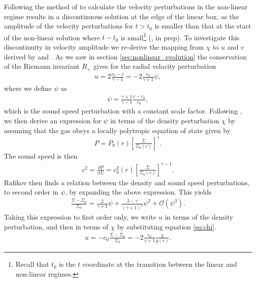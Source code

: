 Following the method of \citet{bollati2021} to calculate the velocity perturbations in the non-linear regime results in a discontinuous solution at the edge of the linear box, as the amplitude of the velocity perturbations for $t>t_0$ is smaller than that at the start of the non-linear solution where $t-t_0$ is small\footnote{Recall that $t_0$ is the $t$ coordinate at the transition between the linear and non-linear regimes.} (\citeauthor{fasanoinprep.}, in prep).
To investigate this discontinuity in velocity amplitude we re-derive the mapping from $\chi$ to $u$ and $v$ derived by \citet{rafikov2002a} and \citet{bollati2021}.
As we saw in section \ref{sec:nonlinear_evolution} the conservation of the Riemann invariant $R_+$ gives for the radial velocity perturbation
\begin{align}
    u = 2\frac{c_0-c}{\gamma - 1}=-2\frac{c_0}{\gamma + 1} \psi, \label{eq:u_rafikov}
\end{align}
where we define $\psi$ as
\begin{align}
    \psi = \frac{\gamma+1}{\gamma-1} \frac{c - c_0}{c_0},
\end{align}
which is the sound speed perturbation with a constant scale factor. Following \citet{rafikov2002a}, we then derive an expression for $\psi$ in terms of the density perturbation $\chi$ by assuming that the gas obeys a locally polytropic equation of state given by 
\begin{align}
    P = P_0(r) \left[ \frac{\Sigma}{\Sigma_0(r)} \right]^\gamma. \label{eq:poly_EOS}
\end{align}
The sound speed is then
\begin{align}
    c^2 = \frac{\partial P}{\partial \Sigma} = c_0^2(r) \left[ \frac{\Sigma}{\Sigma_0(r)} \right]^{\gamma-1}.
\end{align}
Rafikov then finds a relation between the density and sound speed perturbations, to second order in $\psi$, by expanding the above expression. 
This yields
\begin{align}
    \frac{\Sigma - \Sigma_0}{\Sigma_0} = \frac{2}{\gamma + 1}\psi + \frac{3 - \gamma}{\left( \gamma + 1  \right)^2} \psi^2 + \mathcal{O}(\psi^3). \label{eq:psi_exp}
\end{align}
Taking this expression to first order only, we write $u$ in terms of the density perturbation, and then in terms of $\chi$ by substituting equation \ref{eq:chi}. 
\begin{align}
    u = - c_0 \frac{\Sigma - \Sigma_0}{\Sigma_0} = -2 \frac{c_0}{\gamma + 1} \frac{\chi}{g(r)}. \label{eq:ap_rad_vel}
\end{align}
